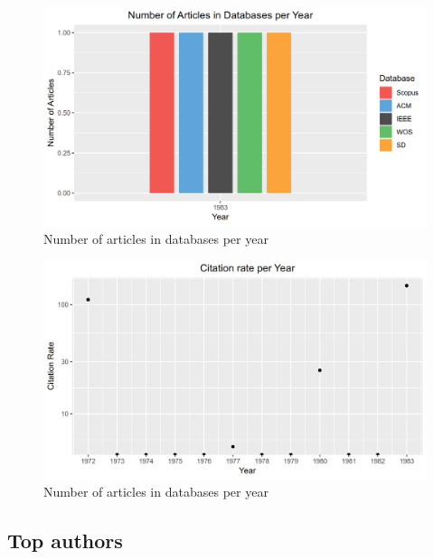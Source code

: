 \documentclass[a4paper, 12pt, oneside, openany, final, pdftex]{book}\usepackage[]{graphicx}\usepackage[]{color}
\makeatletter
\def\maxwidth{ %
  \ifdim\Gin@nat@width>\linewidth
    \linewidth
  \else
    \Gin@nat@width
  \fi
}
\newenvironment{knitrout}{}{} %
\makeatother
\begin{document}
 \begin{figure}[tb]
 	\centering
\begin{knitrout}
\color{fgcolor}
\includegraphics[width=\maxwidth]{figure/ImageFigureDatabases-1} 

\end{knitrout}
 	\caption{Number of articles in databases per year}\label{fig:databases}
 \end{figure}
 
 \begin{figure}[tb]
 	\centering
\begin{knitrout}
\color{fgcolor}
\includegraphics[width=\maxwidth]{figure/ImageFigureCitations-1} 

\end{knitrout}
 	\caption{Number of articles in databases per year}\label{fig:citations}
 \end{figure}
 
 
\subsection{Top authors}\label{sec:topAuthors}
\end{document}
